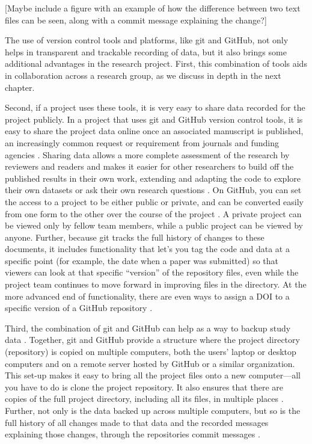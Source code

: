 \documentclass[]{tufte-book}
\begin{document}
{[}Maybe include a figure with an example of how the difference between two
text files can be seen, along with a commit message explaining the change?{]}

The use of version control tools and platforms, like git and GitHub, not only
helps in transparent and trackable recording of data, but it also brings some
additional advantages in the research project. First, this combination of tools
aids in collaboration across a research group, as we discuss in depth in the next
chapter.

Second, if a project uses these tools, it is very easy to share data recorded
for the project publicly. In a project that uses git and GitHub version control
tools, it is easy to share the project data online once an associated manuscript
is published, an increasingly common request or requirement from journals and
funding agencies \citep{blischak2016quick}. Sharing data allows a more complete
assessment of the research by reviewers and readers and makes it easier for
other researchers to build off the published results in their own work,
extending and adapting the code to explore their own datasets or ask their own
research questions \citep{perez2016ten}. On GitHub, you can set the access to a
project to be either public or private, and can be converted easily from one
form to the other over the course of the project \citep{metz2015github}. A private
project can be viewed only by fellow team members, while a public project can be
viewed by anyone. Further, because git tracks the full history of changes to
these documents, it includes functionality that let's you tag the code and data
at a specific point (for example, the date when a paper was submitted) so that
viewers can look at that specific ``version'' of the repository files, even while
the project team continues to move forward in improving files in the directory.
At the more advanced end of functionality, there are even ways to assign a DOI
to a specific version of a GitHub repository \citep{perez2016ten}.

Third, the combination of git and GitHub can help as a way to backup study data
\citep{blischak2016quick, perez2016ten, perkel2018git}. Together, git and GitHub
provide a structure where the project directory (repository) is copied on
multiple computers, both the users' laptop or desktop computers and on a remote
server hosted by GitHub or a similar organization. This set-up makes it easy to
bring all the project files onto a new computer---all you have to do is clone
the project repository. It also ensures that there are copies of the full
project directory, including all its files, in multiple places
\citep{blischak2016quick}. Further, not only is the data backed up across multiple
computers, but so is the full history of all changes made to that data and the
recorded messages explaining those changes, through the repositories commit
messages \citep{perez2016ten}.
\end{document}

